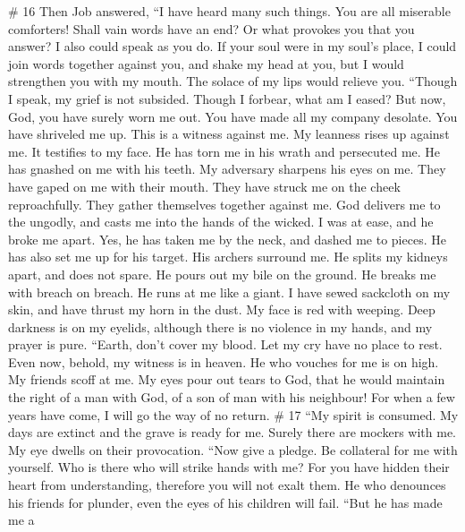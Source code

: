 \# 16  Then Job answered,  ``I have heard many
such things. You are all miserable comforters!  Shall vain
words have an end? Or what provokes you that you answer?  I
also could speak as you do. If your soul were in my soul's place, I
could join words together against you, and shake my head at you,
 but I would strengthen you with my mouth. The solace of my
lips would relieve you.  ``Though I speak, my grief is not
subsided. Though I forbear, what am I eased?  But now, God,
you have surely worn me out. You have made all my company desolate.
 You have shriveled me up. This is a witness against me. My
leanness rises up against me. It testifies to my face.  He
has torn me in his wrath and persecuted me. He has gnashed on me with
his teeth. My adversary sharpens his eyes on me.  They have
gaped on me with their mouth. They have struck me on the cheek
reproachfully. They gather themselves together against me. 
God delivers me to the ungodly, and casts me into the hands of the
wicked.  I was at ease, and he broke me apart. Yes, he has
taken me by the neck, and dashed me to pieces. He has also set me up for
his target.  His archers surround me. He splits my kidneys
apart, and does not spare. He pours out my bile on the ground.
 He breaks me with breach on breach. He runs at me like a
giant.  I have sewed sackcloth on my skin, and have thrust
my horn in the dust.  My face is red with weeping. Deep
darkness is on my eyelids,  although there is no violence
in my hands, and my prayer is pure.  ``Earth, don't cover
my blood. Let my cry have no place to rest.  Even now,
behold, my witness is in heaven. He who vouches for me is on high.
 My friends scoff at me. My eyes pour out tears to God,
 that he would maintain the right of a man with God, of a
son of man with his neighbour!  For when a few years have
come, I will go the way of no return. \# 17  ``My spirit is
consumed. My days are extinct and the grave is ready for me.
 Surely there are mockers with me. My eye dwells on their
provocation.  ``Now give a pledge. Be collateral for me with
yourself. Who is there who will strike hands with me?  For
you have hidden their heart from understanding, therefore you will not
exalt them.  He who denounces his friends for plunder, even
the eyes of his children will fail.  ``But he has made me a
